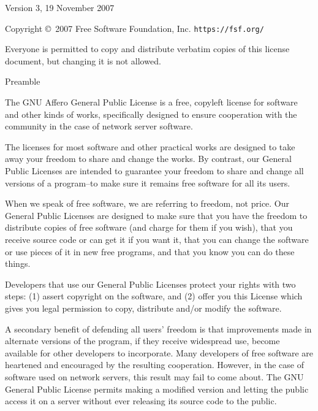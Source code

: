 \documentclass{article}%
\begin{document}
\begin{center}
{\parindent 0in

Version 3, 19 November 2007

Copyright \copyright\  2007 Free Software Foundation, Inc. \texttt{https://fsf.org/}

\bigskip
Everyone is permitted to copy and distribute verbatim copies of this
license document, but changing it is not allowed.}

\end{center}

\begin{center}
{\Large \sc Preamble}
\end{center}

The GNU Affero General Public License is a free, copyleft license
for software and other kinds of works, specifically designed to ensure
cooperation with the community in the case of network server software.

The licenses for most software and other practical works are
designed to take away your freedom to share and change the works.  By
contrast, our General Public Licenses are intended to guarantee your
freedom to share and change all versions of a program--to make sure it
remains free software for all its users.

When we speak of free software, we are referring to freedom, not
price.  Our General Public Licenses are designed to make sure that you
have the freedom to distribute copies of free software (and charge for
them if you wish), that you receive source code or can get it if you
want it, that you can change the software or use pieces of it in new
free programs, and that you know you can do these things.

Developers that use our General Public Licenses protect your rights
with two steps: (1) assert copyright on the software, and (2) offer
you this License which gives you legal permission to copy, distribute
and/or modify the software.

A secondary benefit of defending all users' freedom is that
improvements made in alternate versions of the program, if they
receive widespread use, become available for other developers to
incorporate.  Many developers of free software are heartened and
encouraged by the resulting cooperation.  However, in the case of
software used on network servers, this result may fail to come about.
The GNU General Public License permits making a modified version and
letting the public access it on a server without ever releasing its
source code to the public.
\end{document}
